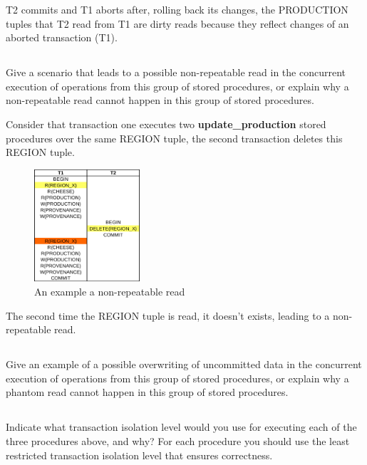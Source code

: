 T2 commits and T1 aborts after, rolling back its changes, the PRODUCTION tuples that T2 read from T1 are dirty reads because they reflect changes of an aborted transaction (T1). 

\subsection{}
{\color{gray}Give a scenario that leads to a possible non-repeatable read in the concurrent execution of operations from this group of stored procedures, or explain why a non-repeatable read cannot happen in this group of stored procedures.}

Consider that transaction one executes two \textbf{update\_production} stored procedures over the same REGION tuple, the second transaction deletes this REGION tuple.

\begin{figure}[H]
	\centering
	\includegraphics[width=0.35\textwidth]{unrepeatable_read.png}
	\caption{An example a non-repeatable read}
\end{figure}

The second time the REGION tuple is read, it doesn't exists, leading to  a non-repeatable read.

\subsection{}
{\color{gray}Give an example of a possible overwriting of uncommitted data in the concurrent execution of operations from this group of stored procedures, or explain why a phantom read cannot happen in this group of stored procedures.}

\subsection{}
{\color{gray}Indicate what transaction isolation level would you use for executing each of the three procedures above, and why? For each procedure you should use the least restricted transaction isolation level that ensures correctness.}
